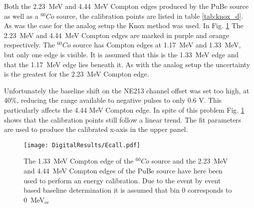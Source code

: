 \documentclass[main.tex]{subfiles}
\begin{document}
Both the \SI{2.23}{\MeV} and \SI{4.44}{\MeV} Compton edges produced by the PuBe source as well as a $^{60}Co$ source, the calibration points are listed in table \ref{tab:knox_d}. As was the case for the analog setup the Knox method was used. In Fig. \ref{fig:D_QDC} The \SI{2.23}{\MeV} and \SI{4.44}{\MeV} Compton edges are marked in purple and orange respectively. The $^{60}Co$ source has Compton edges at \SI{1.17}{\MeV} and \SI{1.33}{\MeV}, but only one edge is visible. It is assumed that this is the \SI{1.33}{\MeV} edge and that the \SI{1.17}{\MeV} edge lies beneath it. As with the analog setup the uncertainty is the greatest for the \SI{2.23}{\MeV} Compton edge.

Unfortunately the baseline shift on the NE213 channel offset was set too high, at 40\%, reducing the range available to negative pulses to only 0.6 V. This particularly affects the 4.44 \si{\MeV} Compton edge. In spite of this problem Fig. \ref{fig:D_QDC} shows that the calibration points still follow a linear trend. The fit parameters are used to produce the calibrated x-axis in the upper panel.

\begin{figure}[ht]
    \centering
        \texttt{[image: DigitalResults/Ecall.pdf]}
        \caption[Energy calibration of the digital setup]{The \SI{1.33}{\MeV} Compton edge of the $^{60}Co$ source and the \SI{2.23}{\MeV} and \SI{4.44}{\MeV} Compton edges of the PuBe source have here been used to perform an energy calibration. Due to the event by event based baseline determination it is assumed that bin 0 corresponds to \SI{0}{\MeV}$_\text{ee}$}
    \label{fig:D_QDC}
\end{figure}
\end{document}
